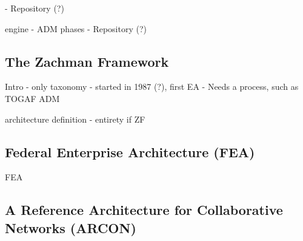 - Repository (?)


engine
- ADM phases
- Repository (?)


\subsection{The Zachman Framework}
Intro
- only taxonomy
- started in 1987 (?), first EA
- Needs a process, such as TOGAF ADM

architecture definition
- entirety if ZF

\subsection{Federal Enterprise Architecture (FEA)}
FEA

\subsection{A Reference Architecture for Collaborative Networks (ARCON)}
